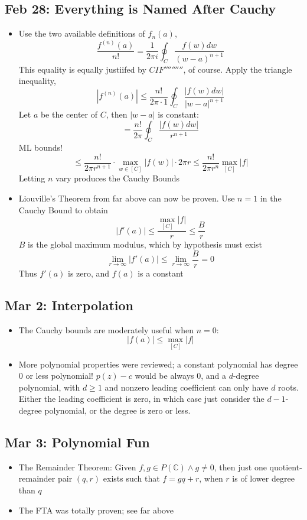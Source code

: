 \documentclass[10pt, oneside]{article}
\newcommand{\lti}[1]{\lim_{#1 \rightarrow \infty}}
\let\leq\leqslant
\let\geq\geqslant
\newcommand{\C}{\mathbb{C}}
\begin{document}
\subsection{Feb 28: Everything is Named After Cauchy}
\begin{itemize}
    \item Use the two available definitions of $f_n(a)$,
        \[\frac{f^{(n)}(a)}{n!} = \frac{1}{2\pi i} \oint_C \frac{f(w) dw}{(w-a)^{n+1}}\]
        This equality is equally justiifed by $CIF''''''''''$, of course. Apply the triangle inequality,
        \[|f^{(n)}(a)| \leq \frac{n!}{2 \pi \cdot 1} \oint_C \frac{|f(w) dw|}{|w-a|^{n+1}}\]
        Let $a$ be the center of $C$, then $|w-a|$ is constant:
        \[= \frac{n!}{2\pi} \oint_C \frac{|f(w) dw|}{r^{n+1}}\]
        ML bounds!
        \[\leq \frac{n!}{2\pi r^{n+1}} \cdot \max_{w \in [C]} |f(w)| \cdot 2\pi r \leq \frac{n!}{2 \pi r^n} \max_{[C]} |f|\]
        Letting $n$ vary produces the Cauchy Bounds
    \item Liouville's Theorem from far above can now be proven. Use $n=1$ in the Cauchy Bound to obtain
        \[|f'(a)| \leq \frac{\displaystyle \max_{[C]} |f|}{r} \leq \frac{B}{r}\]
        $B$ is the global maximum modulus, which by hypothesis must exist
        \[\lti{r} |f'(a)| \leq \lti{r} \frac{B}{r} = 0\]
        Thus $f'(a)$ is zero, and  $f(a)$ is a constant
\end{itemize}

\subsection{Mar 2: Interpolation}
\begin{itemize}
    \item The Cauchy bounds are moderately useful when $n=0$:
        \[|f(a)| \leq \max_{[C]} |f|\]
    \item More polynomial properties were reviewed; a constant polynomial has degree $0$ or less polynomial! $p(z) - c$ would be always 0, and a $d$-degree polynomial, with $d \geq 1$ and nonzero leading coefficient can only have $d$ roots. Either the leading coefficient is zero, in which case just consider the $d-1$-degree polynomial, or the degree is zero or less.
\end{itemize}

\subsection{Mar 3: Polynomial Fun}
\begin{itemize}
    \item The Remainder Theorem: Given $f,g \in P(\C) \land g \neq 0$, then just one quotient-remainder pair $(q,r)$ exists such that $f = gq + r$, when $r$ is of lower degree than $q$
    \item The FTA was totally proven; see far above
\end{itemize}
\end{document}
